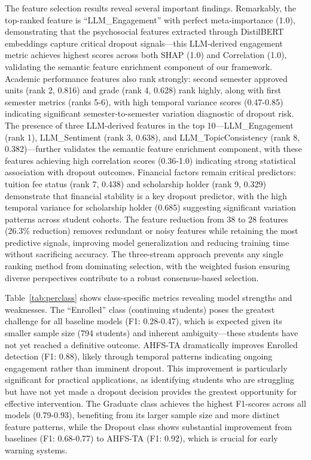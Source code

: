 \documentclass[journal]{IEEEtran}
\begin{document}
The feature selection results reveal several important findings. Remarkably, the top-ranked feature is ``LLM\_Engagement'' with perfect meta-importance (1.0), demonstrating that the psychosocial features extracted through DistilBERT embeddings capture critical dropout signals---this LLM-derived engagement metric achieves highest scores across both SHAP (1.0) and Correlation (1.0), validating the semantic feature enrichment component of our framework. Academic performance features also rank strongly: second semester approved units (rank 2, 0.816) and grade (rank 4, 0.628) rank highly, along with first semester metrics (ranks 5-6), with high temporal variance scores (0.47-0.85) indicating significant semester-to-semester variation diagnostic of dropout risk. The presence of three LLM-derived features in the top 10---LLM\_Engagement (rank 1), LLM\_Sentiment (rank 3, 0.638), and LLM\_TopicConsistency (rank 8, 0.382)---further validates the semantic feature enrichment component, with these features achieving high correlation scores (0.36-1.0) indicating strong statistical association with dropout outcomes. Financial factors remain critical predictors: tuition fee status (rank 7, 0.438) and scholarship holder (rank 9, 0.329) demonstrate that financial stability is a key dropout predictor, with the high temporal variance for scholarship holder (0.685) suggesting significant variation patterns across student cohorts. The feature reduction from 38 to 28 features (26.3\% reduction) removes redundant or noisy features while retaining the most predictive signals, improving model generalization and reducing training time without sacrificing accuracy. The three-stream approach prevents any single ranking method from dominating selection, with the weighted fusion ensuring diverse perspectives contribute to a robust consensus-based selection.

Table~\ref{tab:perclass} shows class-specific metrics revealing model strengths and weaknesses. The ``Enrolled'' class (continuing students) poses the greatest challenge for all baseline models (F1: 0.28-0.47), which is expected given its smaller sample size (794 students) and inherent ambiguity---these students have not yet reached a definitive outcome. AHFS-TA dramatically improves Enrolled detection (F1: 0.88), likely through temporal patterns indicating ongoing engagement rather than imminent dropout. This improvement is particularly significant for practical applications, as identifying students who are struggling but have not yet made a dropout decision provides the greatest opportunity for effective intervention. The Graduate class achieves the highest F1-scores across all models (0.79-0.93), benefiting from its larger sample size and more distinct feature patterns, while the Dropout class shows substantial improvement from baselines (F1: 0.68-0.77) to AHFS-TA (F1: 0.92), which is crucial for early warning systems.
\end{document}
